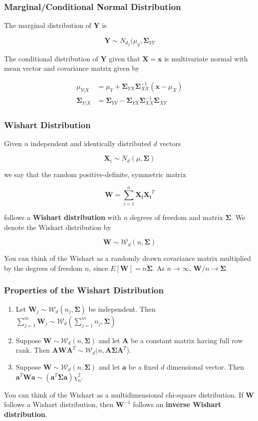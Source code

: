 \documentclass{beamer}
\begin{document}
\begin{frame}
\frametitle{Marginal/Conditional Normal Distribution}
The marginal distribution of $\mathbf{Y}$ is

$$\mathbf{Y} \sim N_{d_2}(\mu_y, \mathbf{\Sigma}_{YY}$$

The conditional distribution of $\mathbf{Y}$ given that $\mathbf{X} = \mathbf{x}$ is multivariate normal with mean vector and covariance matrix given by

\begin{align*}
\mu_{Y|X} &= \mu_Y + \mathbf{\Sigma}_{YX} \mathbf{\Sigma}_{XX}^{-1} (\mathbf{x} - \mu_X)\\
\mathbf{\Sigma}_{Y|X} &= \mathbf{\Sigma}_{YY} - \mathbf{\Sigma}_{YX}\mathbf{\Sigma}_{XX}^{-1}\mathbf{\Sigma}_{XY}
\end{align*}

\end{frame}

\begin{frame}
\frametitle{Wishart Distribution}
Given $n$ independent and identically distributed $d$ vectors

$$\mathbf{X}_i \sim N_d(\mu , \mathbf{\Sigma})$$

we say that the random positive-definite, symmetric matrix

$$ \mathbf{W} = \sum_{i = 1}^n \mathbf{X_i} \mathbf{X_i}^T$$

follows a \textbf{Wishart distribution} with $n$ degrees of freedom and matrix $\mathbf{\Sigma}$.  We denote the Wishart distribution by

$$\mathbf{W} \sim \mathcal{W}_d(n, \mathbf{\Sigma})$$

You can think of the Wishart as a randomly drawn covariance matrix multiplied by the degrees of freedom $n$, since $E[\mathbf{W}] = n\mathbf{\Sigma}$.  As $n \rightarrow \infty$, $\mathbf{W}/n \rightarrow \mathbf{\Sigma}$. 
\end{frame}

\begin{frame}
\frametitle{Properties of the Wishart Distribution}
\begin{enumerate}
\item Let $\mathbf{W}_j \sim \mathcal{W}_d(n_j, \mathbf{\Sigma})$ be independent.  Then $\sum_{j = 1}^m \mathbf{W}_j \sim \mathcal{W}_d(\sum_{j=1}^m n_j, \mathbf{\Sigma})$
\item Suppose $\mathbf{W} \sim \mathcal{W}_d(n, \mathbf{\Sigma})$ and let $\mathbf{A}$ be a constant matrix having full row rank.  Then $\mathbf{AWA}^T \sim \mathcal{W}_d(n, \mathbf{A\Sigma A}^T$).
\item  Suppose $\mathbf{W} \sim \mathcal{W}_d(n, \mathbf{\Sigma})$ and let $\mathbf{a}$ be a fixed $d$ dimensional vector.  Then $\mathbf{a}^T\mathbf{Wa} \sim (\mathbf{a}^T\mathbf{\Sigma a})\chi^2_n$.
\end{enumerate}

You can think of the Wishart as a multidimensional chi-square distribution.  If $\mathbf{W}$ follows a Wishart distribution, then $\mathbf{W}^{-1}$ follows an \textbf{inverse Wishart distribution}.
\end{frame}
\end{document}
